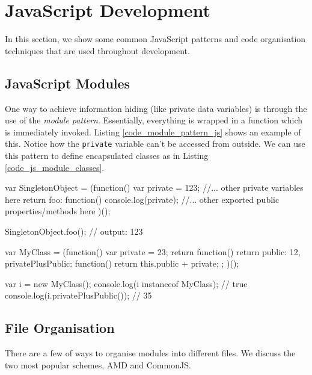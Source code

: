 \section{JavaScript Development} %
\label{sec:javascript_development}
In this section, we show some common JavaScript patterns and code organisation techniques that are used throughout development.

\subsection{JavaScript Modules} %
\label{sub:javascript_modules}
One way to achieve information hiding (like private data variables) is through the use of the \emph{module pattern}. Essentially, everything is wrapped in a function which is immediately invoked. Listing \ref{code_module_pattern_js} shows an example of this. Notice how the \lstinline{private} variable can't be accessed from outside. We can use this pattern to define encapsulated classes as in Listing \ref{code_js_module_classes}.

\begin{code}
var SingletonObject = (function(){
  var private = 123;
  //... other private variables here
  return {
    foo: function(){
      console.log(private);
    }
    //... other exported public properties/methods here
  }
})();

SingletonObject.foo(); // output: 123
\end{code}

\begin{code}
var MyClass = (function(){
  var private = 23;
  return function(){
    return {
      public: 12,
      privatePlusPublic: function(){
        return this.public + private;
      }
    }
  };
})();

var i = new MyClass();
console.log(i instanceof MyClass); // true
console.log(i.privatePlusPublic()); // 35
\end{code}

\subsection{File Organisation} %
\label{sub:js_file_organisation}
There are a few of ways to organise modules into different files. We discuss the two most popular schemes, AMD and CommonJS. 

